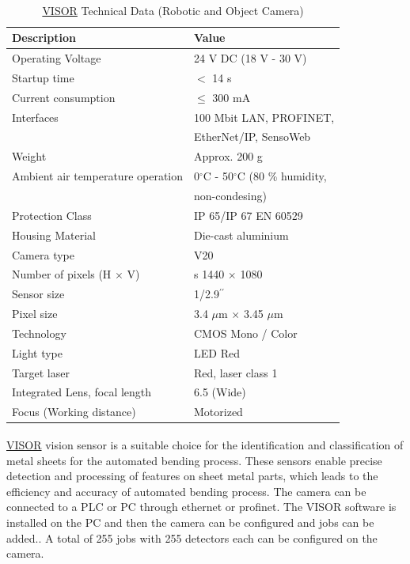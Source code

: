 \begin{table}[h!]
    \centering
    \small
    \renewcommand{\arraystretch}{1.2} %
    \begin{tabular}{ll}
        \textbf{Description} & \textbf{Value} \\ \hline
        Operating Voltage & 24 V DC (18 V - 30 V) \\
        Startup time & $<$ 14 s\\
        Current consumption & $\leq$ 300 mA \\
        Interfaces & 100 Mbit LAN, PROFINET,\\
        & EtherNet/IP, SensoWeb\\ 
        Weight & Approx. 200 g \\ 
        Ambient air temperature operation & 0$^\circ$C - 50$^\circ$C (80 \% humidity,\\
        & non-condesing) \\ 
        Protection Class & IP 65/IP 67 EN 60529\\
        Housing Material & Die-cast aluminium\\
        Camera type & V20 \\ 
        Number of pixels (H $\times$ V) &s 1440 $\times$ 1080\\
        Sensor size & 1/2.9$^{\prime\prime}$ \\ 
        Pixel size & 3.4 $\mu$m $\times$ 3.45 $\mu$m\\
        Technology & CMOS Mono / Color\\
        Light type & LED Red\\ 
        Target laser & Red, laser class 1\\ 
        Integrated Lens, focal length & 6.5 (Wide)\\
        Focus (Working distance) & Motorized \\ \hline
    \end{tabular}
    \caption{\hyperref[acro:VISOR]{VISOR}\textsuperscript{\textregistered} Technical Data (Robotic and Object Camera)}
    \label{visor-technical-data}
\end{table}

\hyperref[acro:VISOR]{VISOR}\textsuperscript{\textregistered} vision sensor is a suitable choice for the identification and classification of metal sheets for the automated bending process. These sensors enable precise detection and processing of features on sheet metal parts, which leads to the efficiency and accuracy of automated bending process. The camera can be connected to a PLC or PC through ethernet or profinet. The VISOR software is installed on the PC and then the camera can be configured and jobs can be added.\cite{sensopart-software}. A total of 255 jobs with 255 detectors each can be configured on the camera.

